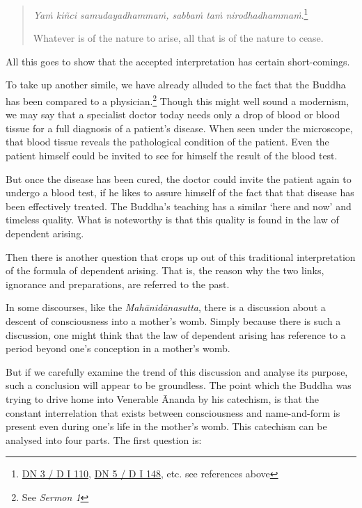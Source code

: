 \begin{quote}
\emph{Yaṁ kiñci samudayadhammaṁ, sabbaṁ taṁ nirodhadhammaṁ}.\footnote{\href{https://suttacentral.net/dn3/pli/ms}{DN 3 / D I 110}, \href{https://suttacentral.net/dn5/pli/ms}{DN 5 / D I 148}, etc. see references above}

Whatever is of the nature to arise, all that is of the nature to cease.
\end{quote}

All this goes to show that the accepted interpretation has certain short-comings.

To take up another simile, we have already alluded to the fact that the Buddha has been compared to a physician.\footnote{See \emph{Sermon 1}} Though this might well sound a modernism, we may say that a specialist doctor today needs only a drop of blood or blood tissue for a full diagnosis of a patient's disease. When seen under the microscope, that blood tissue reveals the pathological condition of the patient. Even the patient himself could be invited to see for himself the result of the blood test.

But once the disease has been cured, the doctor could invite the patient again to undergo a blood test, if he likes to assure himself of the fact that that disease has been effectively treated. The Buddha's teaching has a similar `here and now' and timeless quality. What is noteworthy is that this quality is found in the law of dependent arising.

Then there is another question that crops up out of this traditional interpretation of the formula of dependent arising. That is, the reason why the two links, ignorance and preparations, are referred to the past.

In some discourses, like the \emph{Mahānidānasutta}, there is a discussion about a descent of consciousness into a mother's womb. Simply because there is such a discussion, one might think that the law of dependent arising has reference to a period beyond one's conception in a mother's womb.

But if we carefully examine the trend of this discussion and analyse its purpose, such a conclusion will appear to be groundless. The point which the Buddha was trying to drive home into Venerable Ānanda by his catechism, is that the constant interrelation that exists between consciousness and name-and-form is present even during one's life in the mother's womb. This catechism can be analysed into four parts. The first question is:

